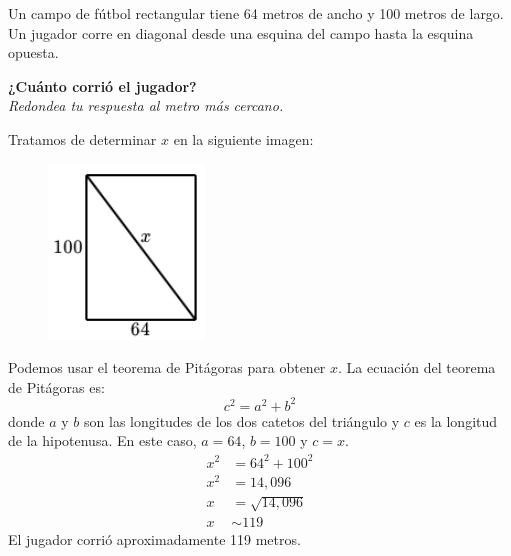 Un campo de fútbol rectangular tiene 64 metros de ancho y 100 metros de largo.
Un jugador corre en diagonal desde una esquina del campo hasta la esquina opuesta.

\textbf{¿Cuánto corrió el jugador?}\\
\textit{Redondea tu respuesta al metro más cercano.}


\begin{solutionbox}{13cm}
    Tratamos de determinar $x$ en la siguiente imagen:
    \begin{figure}[H]
        \centering
        \includegraphics[width=0.2\linewidth]{../images/proverb_pitagoras_12.png}
        \caption{}
        \label{fig:proverb_pitagoras_12}
    \end{figure}
    Podemos usar el teorema de Pitágoras para obtener $x$.
    La ecuación del teorema de Pitágoras es:
    \[c^2=a^2+b^2\]
    donde $a$ y $b$ son las longitudes de los dos catetos del triángulo y $c$ es la longitud de la hipotenusa.
    En este caso, $a=64$, $b=100$ y $c=x$.
    \begin{align*}
        x^2 & =64^2+100^2    \\
        x^2 & = 14,096       \\
        x   & =\sqrt{14,096} \\
        x   & \sim 119
    \end{align*}
    El jugador corrió aproximadamente 119 metros.
\end{solutionbox}